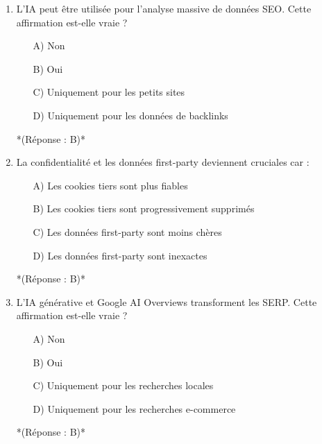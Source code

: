 \documentclass[12pt,a4paper,twoside]{report}
\begin{document}
\begin{enumerate}
    \item L'IA peut être utilisée pour l'analyse massive de données SEO. Cette affirmation est-elle vraie ?
    \begin{itemize}
        \item[A)] Non
        \item[B)] Oui
        \item[C)] Uniquement pour les petits sites
        \item[D)] Uniquement pour les données de backlinks
    \end{itemize}
    *(Réponse : B)*

    \item La confidentialité et les données first-party deviennent cruciales car :
    \begin{itemize}
        \item[A)] Les cookies tiers sont plus fiables
        \item[B)] Les cookies tiers sont progressivement supprimés
        \item[C)] Les données first-party sont moins chères
        \item[D)] Les données first-party sont inexactes
    \end{itemize}
    *(Réponse : B)*

    \item L'IA générative et Google AI Overviews transforment les SERP. Cette affirmation est-elle vraie ?
    \begin{itemize}
        \item[A)] Non
        \item[B)] Oui
        \item[C)] Uniquement pour les recherches locales
        \item[D)] Uniquement pour les recherches e-commerce
    \end{itemize}
    *(Réponse : B)*
\end{enumerate}
\end{document}
